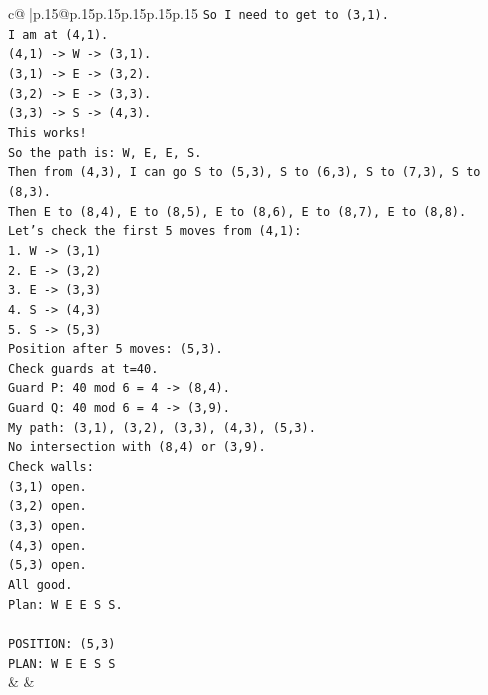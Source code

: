 \documentclass{article}
\begin{document}
{\begin{supertabular}{c@{$\;$}|p{.15\linewidth}@{}p{.15\linewidth}p{.15\linewidth}p{.15\linewidth}p{.15\linewidth}p{.15\linewidth}}
{{{\texttt{So I need to get to (3,1).} \\
\texttt{I am at (4,1).} \\
\texttt{(4,1) {-}> W {-}> (3,1).} \\
\texttt{(3,1) {-}> E {-}> (3,2).} \\
\texttt{(3,2) {-}> E {-}> (3,3).} \\
\texttt{(3,3) {-}> S {-}> (4,3).} \\
\texttt{This works!} \\
\texttt{So the path is: W, E, E, S.} \\
\texttt{Then from (4,3), I can go S to (5,3), S to (6,3), S to (7,3), S to (8,3).} \\
\texttt{Then E to (8,4), E to (8,5), E to (8,6), E to (8,7), E to (8,8).} \\
\texttt{Let's check the first 5 moves from (4,1):} \\
\texttt{1. W {-}> (3,1)} \\
\texttt{2. E {-}> (3,2)} \\
\texttt{3. E {-}> (3,3)} \\
\texttt{4. S {-}> (4,3)} \\
\texttt{5. S {-}> (5,3)} \\
\texttt{Position after 5 moves: (5,3).} \\
\texttt{Check guards at t=40.} \\
\texttt{Guard P: 40 mod 6 = 4 {-}> (8,4).} \\
\texttt{Guard Q: 40 mod 6 = 4 {-}> (3,9).} \\
\texttt{My path: (3,1), (3,2), (3,3), (4,3), (5,3).} \\
\texttt{No intersection with (8,4) or (3,9).} \\
\texttt{Check walls:} \\
\texttt{(3,1) open.} \\
\texttt{(3,2) open.} \\
\texttt{(3,3) open.} \\
\texttt{(4,3) open.} \\
\texttt{(5,3) open.} \\
\texttt{All good.} \\
\texttt{Plan: W E E S S.} \\
\\ 
\texttt{POSITION: (5,3)} \\
\texttt{PLAN: W E E S S} \\
            }
        }
    }
    & & \\ \\


\end{supertabular}}
\end{document}
